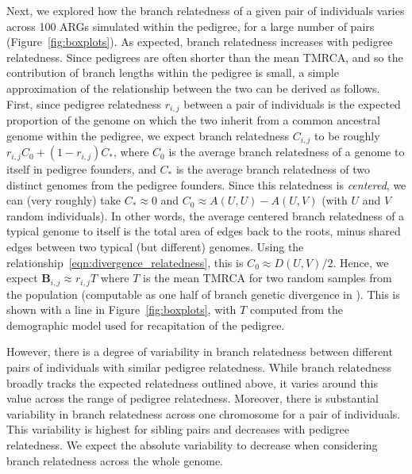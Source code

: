 Next, we explored how the branch relatedness of a given pair of individuals
varies across 100 ARGs simulated within the pedigree,
for a large number of pairs
(Figure~\ref{fig:boxplots}).
%
As expected, branch relatedness increases with pedigree relatedness.
%
Since pedigrees are often shorter than the mean TMRCA,
and so the contribution of branch lengths within the pedigree is small,
a simple approximation of the relationship between the two
can be derived as follows.
%
First, since pedigree relatedness $r_{i,j}$ between a pair of individuals
is the expected proportion of the genome on which the two inherit from
a common ancestral genome within the pedigree,
we expect branch relatedness $C_{i,j}$ to be roughly $r_{i,j} C_0 + (1 - r_{i,j}) C_*$,
where $C_0$ is the average branch relatedness of a genome to itself in pedigree founders,
and $C_*$ is the average branch relatedness of two distinct genomes from the pedigree founders.
%
Since this relatedness is \emph{centered}, we can (very roughly) take
$C_* \approx 0$ and $C_0 \approx A(U,U) - A(U,V)$ (with $U$ and $V$ random individuals).
%
In other words, the average centered branch relatedness
of a typical genome to itself is the total area of edges back to the roots,
minus shared edges between two typical (but different) genomes.
%
Using the relationship~\eqref{eqn:divergence_relatedness},
this is $C_0 \approx D(U,V)/2$.
%
Hence, we expect $\mathbf{B}_{i,j} \approx r_{i,j} T$
where $T$ is the mean TMRCA for two random samples from the population
(computable as one half of branch genetic divergence in \tskit{}).
%
This is shown with a line in Figure~\ref{fig:boxplots},
with $T$ computed from the demographic model used for recapitation of the pedigree.

However, there is a degree of variability in branch relatedness
between different pairs of individuals with similar pedigree relatedness.
%
While branch relatedness broadly tracks the expected relatedness outlined above,
it varies around this value across the range of pedigree relatedness.
%
Moreover, there is substantial variability in branch relatedness across one chromosome
for a pair of individuals.
%
This variability is highest for sibling pairs and decreases with pedigree relatedness.
%
We expect the absolute variability to decrease when considering
branch relatedness across the whole genome.

